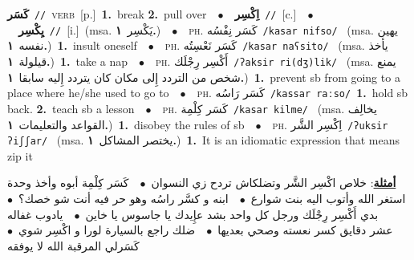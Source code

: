 \documentclass[10pt,a4paper,twoside]{article} %
\begin{document}
\begin{multicols}{2}
{\setlength\topsep{0pt}\textbf{\foreignlanguage{arabic}{كَسَر}}\ {\color{gray}\texttt{//}\color{black}}\ \textsc{verb}\ [p.]\ \textbf{1.}~break  \textbf{2.}~pull over\ \ $\bullet$\ \ \setlength\topsep{0pt}\textbf{\foreignlanguage{arabic}{اِكْسِر}}\ {\color{gray}\texttt{//}\color{black}}\ [c.]\ \ $\bullet$\ \ \setlength\topsep{0pt}\textbf{\foreignlanguage{arabic}{يِكْسِر}}\ {\color{gray}\texttt{//}\color{black}}\ [i.]\ \color{gray}(msa. \foreignlanguage{arabic}{يَكْسِر}~\foreignlanguage{arabic}{\textbf{١.}})\color{black}\ \ $\bullet$\ \ \textsc{ph.} \color{gray} \foreignlanguage{arabic}{كَسَر نِفْسُه}\color{black}\ {\color{gray}\texttt{/{\sffamily kasar nifso}/}\color{black}}\ \color{gray} (msa. \foreignlanguage{arabic}{يهين نفسه}~\foreignlanguage{arabic}{\textbf{١.}})\color{black}\ \textbf{1.}~insult oneself\ \ $\bullet$\ \ \textsc{ph.} \color{gray} \foreignlanguage{arabic}{كَسَر نَعْسِتُه}\color{black}\ {\color{gray}\texttt{/{\sffamily kasar naʕsito}/}\color{black}}\ \color{gray} (msa. \foreignlanguage{arabic}{يأخذ قيلولة}~\foreignlanguage{arabic}{\textbf{١.}})\color{black}\ \textbf{1.}~take a nap\ \ $\bullet$\ \ \textsc{ph.} \color{gray} \foreignlanguage{arabic}{أَكْسِر رِجْلَك}\color{black}\ {\color{gray}\texttt{/{\sffamily ʔaksir ri(dʒ)lik}/}\color{black}}\ \color{gray} (msa. \foreignlanguage{arabic}{يمنع شخص من التردد إِلى مكان كان يتردد إِليه سابقا}~\foreignlanguage{arabic}{\textbf{١.}})\color{black}\ \textbf{1.}~prevent sb from going to a place where he/she used to go to\ \ $\bullet$\ \ \textsc{ph.} \color{gray} \foreignlanguage{arabic}{كَسَر رَاسُه}\color{black}\ {\color{gray}\texttt{/{\sffamily kassar raːso}/}\color{black}}\ \textbf{1.}~hold sb back.  \textbf{2.}~teach sb a lesson\ \ $\bullet$\ \ \textsc{ph.} \color{gray} \foreignlanguage{arabic}{كَسَر كِلْمِة}\color{black}\ {\color{gray}\texttt{/{\sffamily kasar kilme}/}\color{black}}\ \color{gray} (msa. \foreignlanguage{arabic}{يخالِف القواعد والتعليمات}~\foreignlanguage{arabic}{\textbf{١.}})\color{black}\ \textbf{1.}~disobey the rules of sb\ \ $\bullet$\ \ \textsc{ph.} \color{gray} \foreignlanguage{arabic}{اِكْسِر الشَّر}\color{black}\ {\color{gray}\texttt{/{\sffamily ʔuksir ʔiʃʃar}/}\color{black}}\ \color{gray} (msa. \foreignlanguage{arabic}{يختصر المشاكل}~\foreignlanguage{arabic}{\textbf{١.}})\color{black}\ \textbf{1.}~It is an idiomatic expression that means zip it\  \begin{flushright}\color{gray}\foreignlanguage{arabic}{\textbf{\underline{\foreignlanguage{arabic}{أمثلة}}}: خلاص اكْسِر الشَّر وتضلكاش تردح زي النسوان\ $\bullet$\ \  كَسَر كِلْمِة أبوه وأخذ وحدة استغر الله وأتوب اليه بنت شوارع\ $\bullet$\ \  ابنه و كسَّر راسُه وهو حر فيه أنت شو خصك؟\ $\bullet$\ \  بدي أَكْسِر رِجْلَك ورجل كل واحد بشد عإِيدك يا جاسوس يا خاين\ $\bullet$\ \  يادوب غفاله عشر دقايق كسر نعسته وصحي بعديها\ $\bullet$\ \  ضلك راجع بالسيارة  لورا و اكْسِر شوي\ $\bullet$\ \  كَسَرلي المرقبة الله لا يوفقه}\end{flushright}\color{black}} \vspace{2mm}


\end{multicols}
\end{document}
